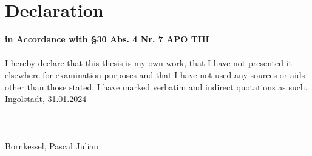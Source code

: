 \cleardoublepage
\setlength{\parindent}{0pt}
\setlength{\parskip}{10pt}	

\chapter*{Declaration}
\vspace{-40pt} %
\hspace{0.0001pt} {\normalsize \textbf{in Accordance with §30 Abs. 4 Nr. 7 APO THI}} \\ \\


I hereby declare that this thesis is my own work, that I have not presented it elsewhere
for examination purposes and that I have not used any sources or aids other than those
stated. I have marked verbatim and indirect quotations as such. \\


Ingolstadt, 31.01.2024 \\ \\ \\ \\



\small Bornkessel, Pascal Julian
